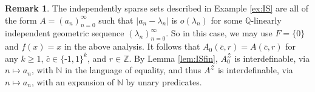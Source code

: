 \documentclass{amsart}
\newcommand{\nv}{\text{-}}
\newcommand{\cbar}{\bar{c}}
\newcommand{\cZ}{\mathcal{Z}}
\def\N{\mathbb N}
\def\Q{\mathbb Q}
\def\Z{\mathbb Z}
\theoremstyle{definition}
\newtheorem{remark}[theorem]{Remark}
\begin{document}
\begin{remark}
The independently sparse sets described  in Example \ref{ex:IS} are all of the form $A=(a_n)_{n=0}^\infty$ such that $|a_n-\lambda_n|$ is $o(\lambda_n)$ for some $\Q$-linearly independent geometric sequence $(\lambda_n)_{n=0}^\infty$. So in this case, we may use $F=\{0\}$ and $f(x)=x$ in the above analysis. It follows that $A_0(\cbar,r)=A(\cbar,r)$ for any $k\geq 1$, $\cbar\in\{\nv1,1\}^k$, and $r\in\Z$. By Lemma \ref{lem:ISfin}, $A^{\cZ}_0$ is interdefinable, via $n\mapsto a_n$, with $\N$ in the language of equality, and thus $A^{\cZ}$ is interdefinable, via $n\mapsto a_n$, with an expansion of $\N$ by unary predicates. 
\end{remark}





%


\end{document}
